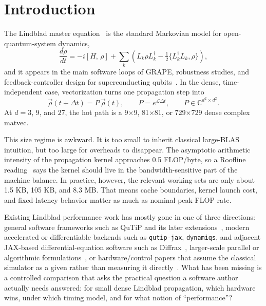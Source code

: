 \documentclass[3p,times,twocolumn]{elsarticle}
\newcommand{\comm}[2]{[#1,\,#2]}
\newcommand{\dv}[2]{\frac{d#1}{d#2}}
\begin{document}
\section{Introduction}

The Lindblad master equation~\cite{Lindblad1976,Gorini1976} is the standard
Markovian model for open-quantum-system dynamics,
\begin{equation}
  \dv{\rho}{t} = -i\comm{H}{\rho}
  + \sum_k \left(L_k \rho L_k^\dagger
  - \tfrac{1}{2}\{L_k^\dagger L_k,\rho\}\right),
\end{equation}
and it appears in the main software loops of GRAPE, robustness studies, and
feedback-controller design for superconducting qubits~\cite{Khaneja2005}. In
the dense, time-independent case, vectorization turns one propagation step
into
\begin{equation}
  \vec{\rho}(t+\Delta t) = P\,\vec{\rho}(t), \qquad
  P = e^{\mathcal{L}\Delta t}, \qquad
  P \in \mathbb{C}^{d^2 \times d^2}.
\end{equation}
At $d=3$, $9$, and $27$, the hot path is a 9$\times$9, 81$\times$81, or
729$\times$729 dense complex matvec.

This size regime is awkward. It is too small to inherit classical large-BLAS
intuition, but too large for overheads to disappear. The asymptotic
arithmetic intensity of the propagation kernel approaches 0.5 FLOP/byte, so
a Roofline reading~\cite{Williams2009} says the kernel should live in the
bandwidth-sensitive part of the machine balance. In practice, however, the
relevant working sets are only about 1.5 KB, 105 KB, and 8.3 MB. That means
cache boundaries, kernel launch cost, and fixed-latency behavior matter as
much as nominal peak FLOP rate.

Existing Lindblad performance work has mostly gone in one of three
directions: general software frameworks such as QuTiP and its later
extensions~\cite{Johansson2012,Johansson2013,Lambert2026}, modern
accelerated or differentiable backends such as \texttt{qutip-jax},
\texttt{dynamiqs}, and adjacent JAX-based differential-equation software such
as Diffrax~\cite{QuTiPJax,Guilmin2024,Diffrax2026},
larger-scale parallel or algorithmic formulations~\cite{Meyerov2019}, or
hardware/control papers that assume the classical simulator as a given
rather than measuring it directly~\cite{Gebauer2020,Yang2021,Caune2024}.
What has been missing is a controlled comparison that asks the practical
question a software author actually needs answered: for small dense Lindblad
propagation, which hardware wins, under which timing model, and for what
notion of ``performance''?
\end{document}
